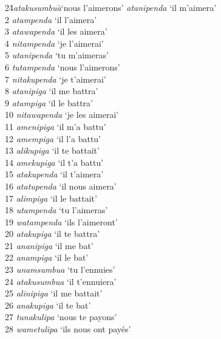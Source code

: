 {    \begin{tabbing}
    24\hspace{2\tabcolsep}\=\hspace{2\tabcolsep}\textit{atakusumbua}\hspace{2\tabcolsep}\=\hspace{2\tabcolsep}‘nous l’aimerons’  \> \textit{atanipenda}   \> ‘il m’aimera’\\
    2  \> \textit{atampenda}    \> ‘il l’aimera’\\
    3  \> \textit{atawapenda}   \> ‘il les aimera’\\
    4  \> \textit{nitampenda}   \> ‘je l’aimerai’\\
    5  \> \textit{utanipenda}   \> ‘tu m’aimeras’\\
    6  \> \textit{tutampenda}   \> ‘nous l’aimerons’\\
    7  \> \textit{nitakupenda}  \> ‘je t’aimerai’\\
    8  \> \textit{atanipiga}    \> ‘il me battra’\\
    9  \> \textit{atampiga}     \> ‘il le battra’\\
    10 \> \textit{nitawapenda}  \> ‘je les aimerai’\\
    11 \> \textit{amenipiga}    \> ‘il m’a battu’\\
    12 \> \textit{amempiga}     \> ‘il l’a battu’\\
    13 \> \textit{alikupiga}    \> ‘il te battait’\\
    14 \> \textit{amekupiga}    \> ‘il t’a battu’\\
    15 \> \textit{atakupenda}   \> ‘il t’aimera’\\
    16 \> \textit{atatupenda}   \> ‘il nous aimera’\\
    17 \> \textit{alimpiga}     \> ‘il le battait’\\
    18 \> \textit{utampenda}    \> ‘tu l’aimeras’\\
    19 \> \textit{watampenda}   \> ‘ils l’aimeront’\\
    20 \> \textit{atakupiga}    \> ‘il te battra’\\
    21 \> \textit{ananipiga}    \> ‘il me bat’\\
    22 \> \textit{anampiga}     \> ‘il le bat’\\
    23 \> \textit{unamsumbua}   \> ‘tu l’ennuies’\\
    24 \> \textit{atakusumbua}  \> ‘il t’ennuiera’\\
    25 \> \textit{alinipiga}    \> ‘il me battait’\\
    26 \> \textit{anakupiga}    \> ‘il te bat’\\
    27 \> \textit{tunakulipa}   \> ‘nous te payons’\\
    28 \> \textit{wametulipa}   \> ‘ils nous ont payés’\\
    \end{tabbing}

}
